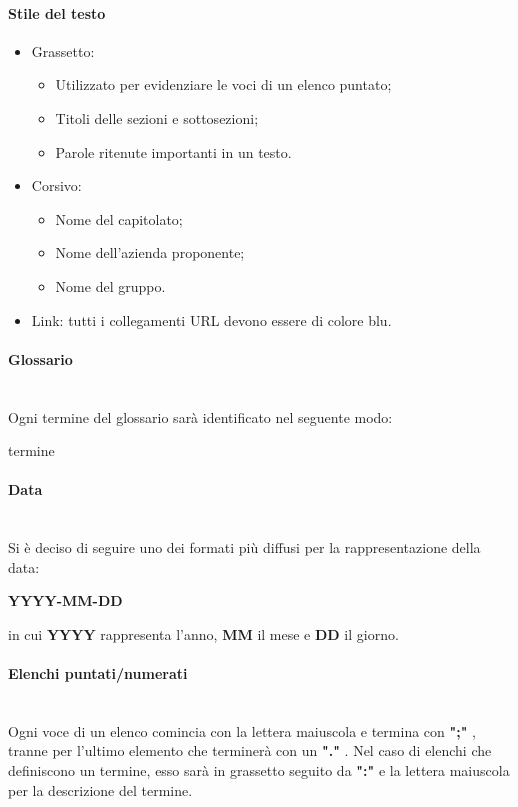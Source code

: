 \paragraph{Stile del testo}\mbox{}
\begin{itemize}
\item Grassetto:
\begin{itemize}
\item Utilizzato per evidenziare le voci di un elenco puntato;
\item Titoli delle sezioni e sottosezioni;
\item Parole ritenute importanti in un testo.
\end{itemize}
\item Corsivo:
\begin{itemize}
\item Nome del capitolato;
\item Nome dell'azienda proponente;
\item Nome del gruppo.
\end{itemize}
\item Link: tutti i collegamenti URL devono essere di colore blu.
\end{itemize}

\paragraph{Glossario}\mbox{} \\
Ogni termine del glossario sarà identificato nel seguente modo:
\begin{center}
termine
\end{center}

\paragraph{Data}\mbox{} \\
Si è deciso di seguire uno dei formati più diffusi per la rappresentazione della data:
\begin{center}
\textbf{YYYY-MM-DD}
\end{center}
in cui \textbf{YYYY} rappresenta l'anno, \textbf{MM} il mese e \textbf{DD} il giorno.

\paragraph{Elenchi puntati/numerati}\mbox{} \\
Ogni voce di un elenco comincia con la lettera maiuscola e termina con \textbf{";"} , tranne per l'ultimo elemento che terminerà con un \textbf{"."} . 
Nel caso di elenchi che definiscono un termine, esso sarà in grassetto seguito da \textbf{":"} e la lettera maiuscola per la descrizione del termine.

